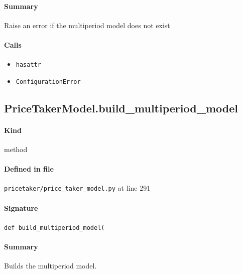 \documentclass[11pt]{report}
\begin{document}
\paragraph{Summary} Raise an error if the multiperiod model does not exist
\paragraph{Calls}
\begin{itemize}[leftmargin=*]
  \item \texttt{hasattr}
  \item \texttt{ConfigurationError}
\end{itemize}
\subsection{PriceTakerModel.build\_multiperiod\_model}
\label{def:pricetaker-price_taker_model.py:PriceTakerModel.build_multiperiod_model:L291}
\paragraph{Kind} method
\paragraph{Defined in file} \texttt{pricetaker/price\_taker\_model.py} at line 291
\paragraph{Signature} \texttt{def build\_multiperiod\_model(}
\paragraph{Summary} Builds the multiperiod model.
\end{document}

